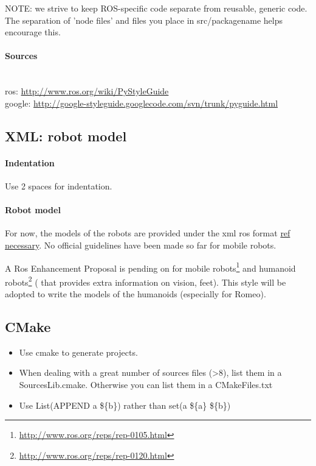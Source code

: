 NOTE: we strive to keep ROS-specific code separate from reusable, generic code. The separation of 'node files' and files you place in src/packagename helps encourage this. 


\paragraph{Sources}~\\
ros: \url{http://www.ros.org/wiki/PyStyleGuide}\\
google: \url{http://google-styleguide.googlecode.com/svn/trunk/pyguide.html}

\subsection{XML: robot model}
\paragraph{Indentation} Use 2 spaces for indentation.

\paragraph{Robot model}
For now, the models of the robots are provided under the xml ros format \url{ref necessary}.
No official guidelines have been made so far for mobile robots.

A Ros Enhancement Proposal is pending on for mobile robots\footnote{\url{http://www.ros.org/reps/rep-0105.html}} 
and humanoid robots\footnote{\url{http://www.ros.org/reps/rep-0120.html}}
( that provides extra information on vision, feet).
This style will be adopted to write the models of the humanoids (especially for Romeo).


\subsection{CMake}
\begin{itemize}
\item Use cmake to generate projects.

\item When dealing with a great number of sources files (>8), list them in a SourcesLib.cmake.
Otherwise you can list them in a CMakeFiles.txt

\item Use List(APPEND a \$\{b\}) rather than set(a \$\{a\} \$\{b\})
\end{itemize}


